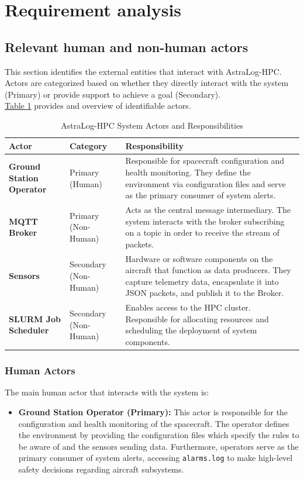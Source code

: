 \documentclass{article}
\newcommand{\tablerefer}[1]{%
    \hyperref[#1_top]{Table \ref*{#1}}%
}
\begin{document}
\clearpage
\section{Requirement analysis}
\subsection{Relevant human and non-human actors}
This section identifies the external entities that interact with AstraLog-HPC. Actors are categorized based on whether they directly interact with the system (Primary) or provide support to achieve a goal (Secondary).\\
\tablerefer{tab:actors} provides and overview of identifiable actors. 
\begin{table}[h!]
\label{tab:actors_top}
\centering
\begin{tabularx}{\textwidth}{|l|l|X|}
\hline
\textbf{Actor} & \textbf{Category} & \textbf{Responsibility} \\ \hline
\textbf{Ground Station Operator} & Primary (Human) & Responsible for spacecraft configuration and health monitoring. They define the environment via configuration files  and serve as the primary consumer of system alerts. \\ \hline
\textbf{MQTT Broker} & Primary (Non-Human) & Acts as the central message intermediary. The system interacts with the broker subscribing on a topic in order to receive the stream of packets. \\ \hline
\textbf{Sensors} & Secondary (Non-Human) & Hardware or software components on the aircraft that function as data producers. They capture telemetry data, encapsulate it into JSON packets, and publish it to the Broker. \\ \hline
\textbf{SLURM Job Scheduler} & Secondary (Non-Human) & Enables access to the HPC cluster. Responsible for allocating resources and scheduling the deployment of system components. \\ \hline
\end{tabularx}
\caption{AstraLog-HPC System Actors and Responsibilities}
\label{tab:actors}
\end{table}

\subsubsection{Human Actors}
The main human actor that interacts with the system is: 
\begin{itemize}
    \item \textbf{Ground Station Operator (Primary):} This actor is responsible for the configuration and health monitoring of the spacecraft. The operator defines the environment by providing the configuration files which specify the rules to be aware of and the sensors sending data. Furthermore, operators serve as the primary consumer of system alerts, accessing \verb|alarms.log| to make high-level safety decisions regarding aircraft subsystems.
\end{itemize}
\end{document}
